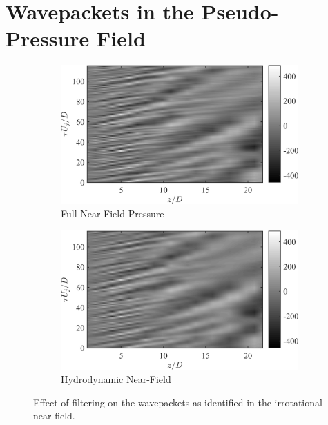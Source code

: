\section{Wavepackets in the Pseudo-Pressure Field}
\begin{figure}
	\centering
	\begin{subfigure}{.5\textwidth}
		\centering
		\includegraphics[width=0.95\linewidth]{Figures/ch3_S000_r1_full_wvpkts.png}
		\caption{Full Near-Field Pressure}
	\end{subfigure}%
	\begin{subfigure}{.5\textwidth}
		\centering
		\includegraphics[width=0.95\linewidth]{Figures/ch3_S000_r1_hydro_wvpkts.png}
		\caption{Hydrodynamic Near-Field}
	\end{subfigure}
	\caption{Effect of filtering on the wavepackets as identified in the irrotational near-field.}
	\label{fig:nearfield_wvpkts_filtering}
\end{figure}

